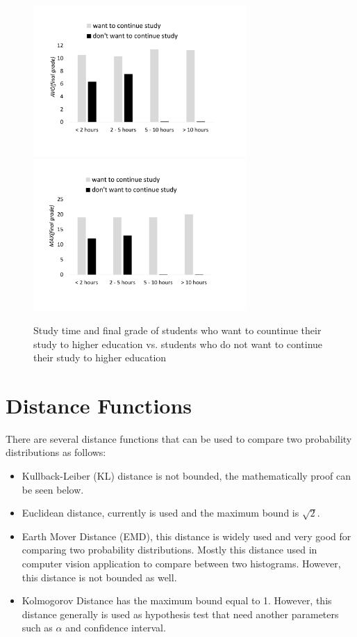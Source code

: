 \documentclass{article}
\begin{document}
\begin{figure}%
	\centering
	\includegraphics[width=3.2in]{figures/AVG_STUDENT}
	\includegraphics[width=3.2in]{figures/MAX_STUDENT}
	\caption{Study time and final grade of students who want to countinue their study to higher education vs. students who do not want to continue their study to higher education}%
	\label{fig:motivation_dataset}%
\end{figure}

\section{Distance Functions}


There are several distance functions that can be used to compare two probability distributions as follows:

\begin{itemize}
	\item Kullback-Leiber (KL) distance is not bounded, the mathematically proof can be seen below.
	\item Euclidean distance, currently is used and the maximum bound is $ \sqrt{2} $.
	\item Earth Mover Distance (EMD), this distance is widely used and very good for comparing two probability distributions. Mostly this distance used in computer vision application to compare between two histograms. However, this distance is not bounded as well.
	\item Kolmogorov Distance has the maximum bound equal to 1. However, this distance generally is used as hypothesis test that need another parameters such as $\alpha$ and confidence interval. 
\end{itemize}
\end{document}
